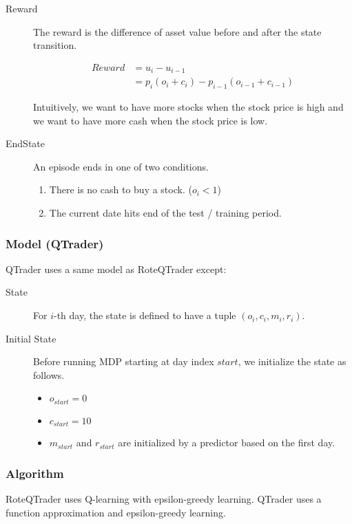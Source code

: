 \documentclass[twocolumn,10pt]{asme2ej}
\begin{document}
\begin{description}
\item[Reward] The reward is the difference of asset value before and
  after the state transition. 
  
  \begin{align*}
    Reward &= u_i - u_{i-1} \\
    &=p_i(o_{i} + c_{i}) - p_{i-1}(o_{i-1} + c_{i-1})
  \end{align*}
  
  Intuitively, we want to have more stocks when the stock price is
  high and we want to have more cash when the stock price is low.

\item[EndState] An episode ends in one of two conditions.
  \begin{enumerate}
  \item There is no cash to buy a stock. ($o_i < 1$)
  \item The current date hits end of the test / training period.
  \end{enumerate}
\end{description}

\subsubsection{Model (QTrader)}

QTrader uses a same model as RoteQTrader except:

\begin{description}
\item[State] For $i$-th day, the state is defined to have a tuple $(o_i,c_i,m_i,r_i)$.

\item[Initial State] Before running MDP starting at day index $start$,
  we initialize the state as follows.
  \begin{itemize}
  \item $o_{start} = 0$
  \item $c_{start} = 10$
  \item $m_{start}$ and $r_{start}$ are initialized by a predictor
    based on the first day.
  \end{itemize}

\end{description}

\subsubsection{Algorithm}

RoteQTrader uses Q-learning with epsilon-greedy learning. QTrader uses a function approximation and epsilon-greedy
learning.
\end{document}
